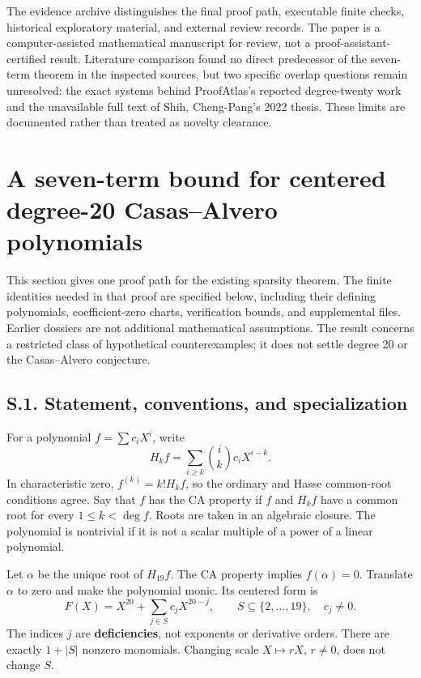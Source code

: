\documentclass[
  british,
  10pt,
]{article}
\begin{document}
The evidence archive distinguishes the final proof path, executable
finite checks, historical exploratory material, and external review
records. The paper is a computer-assisted mathematical manuscript for
review, not a proof-assistant-certified result. Literature comparison
found no direct predecessor of the seven-term theorem in the inspected
sources, but two specific overlap questions remain unresolved: the exact
systems behind ProofAtlas's reported degree-twenty work and the
unavailable full text of Shih, Cheng-Pang's 2022 thesis. These limits
are documented rather than treated as novelty clearance.

\section{A seven-term bound for centered degree-20 Casas--Alvero
polynomials}\label{a-seven-term-bound-for-centered-degree-20-casasalvero-polynomials}

This section gives one proof path for the existing sparsity theorem. The
finite identities needed in that proof are specified below, including
their defining polynomials, coefficient-zero charts, verification
bounds, and supplemental files. Earlier dossiers are not additional
mathematical assumptions. The result concerns a restricted class of
hypothetical counterexamples; it does not settle degree 20 or the
Casas--Alvero conjecture.

\subsection{S.1. Statement, conventions, and
specialization}\label{s.1.-statement-conventions-and-specialization}

For a polynomial \(f=\sum c_iX^i\), write \[
H_kf=\sum_{i\ge k}\binom{i}{k}c_iX^{i-k}.
\] In characteristic zero, \(f^{(k)}=k!H_kf\), so the ordinary and Hasse
common-root conditions agree. Say that \(f\) has the CA property if
\(f\) and \(H_kf\) have a common root for every \(1\le k<\deg f\). Roots
are taken in an algebraic closure. The polynomial is nontrivial if it is
not a scalar multiple of a power of a linear polynomial.

Let \(\alpha\) be the unique root of \(H_{19}f\). The CA property
implies \(f(\alpha)=0\). Translate \(\alpha\) to zero and make the
polynomial monic. Its centered form is \[
F(X)=X^{20}+\sum_{j\in S}c_jX^{20-j},
\qquad S\subseteq\{2,\ldots,19\},\quad c_j\ne0.
\tag{S1}
\] The indices \(j\) are \textbf{deficiencies}, not exponents or
derivative orders. There are exactly \(1+|S|\) nonzero monomials.
Changing scale \(X\mapsto rX\), \(r\ne0\), does not change \(S\).
\end{document}
